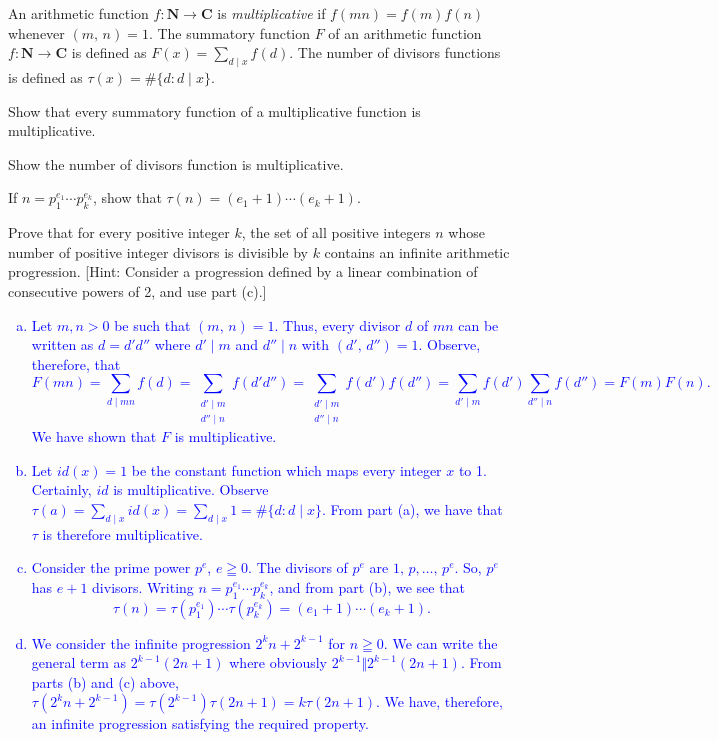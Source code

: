 \documentclass[a4paper,11pt]{article}
\theoremstyle{mythm}
\theoremstyle{mydef}
\newcommand{\blue}[1]{\textcolor{blue}{#1}}
\newcommand{\C}{\mathbf{C}}
\newcommand{\N}{\mathbf{N}}
\begin{document}
 An arithmetic function $f: \N\rightarrow\C$ is {\it
  multiplicative} if $f(mn)=f(m)f(n)$ whenever $(m,\,n)=1$. The summatory
function $F$ of an arithmetic function $f:\N\rightarrow\C$ is defined as
$F(x)=\sum_{d \mid x}f(d)$. The number of divisors functions is defined as
$\tau(x)=\#\{d : d \mid x\}$.
\begin{enumerate*}[{\bf (a)}]
\item Show that every summatory function of a multiplicative function is
  multiplicative.
\item Show the number of divisors function is multiplicative.
\item If $n=p_1^{e_1}\cdots p_k^{e_k}$, show that $\tau(n)=(e_1+1) \cdots (e_k+1)$.
\item Prove that for every positive integer $k$, the set of all positive
  integers $n$ whose number of positive integer divisors is divisible by $k$
  contains an infinite arithmetic progression. [Hint: Consider a progression
  defined by a linear combination of consecutive powers of 2, and use part (c).]
\end{enumerate*}

\blue{
  \begin{enumerate}[(a)]
  \item Let $m,n > 0$ be such that $(m,\,n)=1$. Thus, every divisor $d$ of
    $mn$ can be written as $d=d'd''$ where $d' \mid m$ and $d'' \mid n$ with
    $(d',\,d'')=1$. Observe, therefore, that
    \[
      F(mn) = \sum_{d \mid mn}f(d) = \sum_{\begin{smallmatrix}d' \mid m \\ d''
        \mid n\end{smallmatrix}} f(d'd'') = \sum_{\begin{smallmatrix}d' \mid m
          \\ d'' \mid n\end{smallmatrix}}f(d')f(d'') = \sum_{d' \mid
        m}f(d')\sum_{d'' \mid n}f(d'') = F(m)F(n).
    \]
    We have shown that $F$ is multiplicative.
  \item Let $id(x)=1$ be the constant function which maps every integer $x$ to
    1. Certainly, $id$ is multiplicative. Observe $\tau(a)=\sum_{d \mid
      x}id(x)=\sum_{d \mid x}1=\#\{d : d \mid x\}$. From part (a), we have that
    $\tau$ is therefore multiplicative.
  \item Consider the prime power $p^e$, $e \geqq 0$. The divisors of $p^e$ are
    $1,\,p,\dots,\,p^e$. So, $p^e$ has $e+1$ divisors. Writing $n=p_1^{e_1}
    \cdots p_k^{e_k}$, and from part (b), we see that
    \[
      \tau(n)=\tau(p_1^{e_1}) \cdots \tau(p_k^{e_k}) = (e_1+1)\cdots(e_k+1).
    \]
  \item We consider the infinite progression $2^kn+2^{k-1}$ for $n \geqq 0$. We
    can write the general term as $2^{k-1}(2n+1)$ where obviously $2^{k-1} \Vert
    2^{k-1}(2n+1)$. From parts (b) and (c) above,
    $\tau(2^kn+2^{k-1})=\tau(2^{k-1})\tau(2n+1)=k\tau(2n+1)$. We have,
    therefore, an infinite progression satisfying the required property. \\
  \end{enumerate}
}
\end{document}
